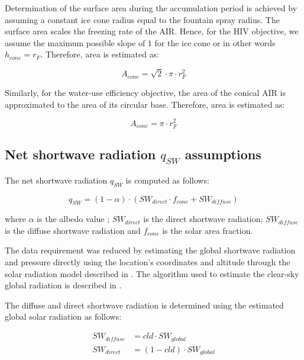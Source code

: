 \documentclass[tc, manuscript]{copernicus}
\begin{document}
Determination of the surface area during the accumulation period is achieved by assuming a constant ice cone
radius equal to the fountain spray radius. The surface area scales the freezing rate of the AIR. Hence, for the
HIV objective, we assume the maximum possible slope of 1 for the ice cone or in other words $h_{cone} = r_{F}$.
Therefore, area is estimated as:  

\begin{equation} A_{cone} =\sqrt{2} \cdot \pi \cdot r_{F}^2  \end{equation}

Similarly, for the water-use efficiency objective, the area of the conical AIR is approximated to the area of
its circular base. Therefore, area is estimated as:

\begin{equation} A_{cone} =\pi \cdot r_{F}^2  \end{equation}

\subsection{Net shortwave radiation \texorpdfstring{$q_{SW}$}{Lg} assumptions}
\label{sec:SW}

The net shortwave radiation $q_{SW}$ is computed as follows:

\begin{equation} 
q_{SW} = (1- \alpha) \cdot ( SW_{direct} \cdot f_{cone} + SW_{diffuse})
\label{eqn:SW} 
\end{equation}

where $\alpha$ is the albedo value ; $SW_{direct}$ is the direct shortwave radiation; $SW_{diffuse}$ is the
diffuse shortwave radiation and $f_{cone}$ is the solar area fraction.

The data requirement was reduced by estimating the global shortwave radiation and pressure directly using the
location's coordinates and altitude through the solar radiation model described in
\citet{holmgrenPvlibPythonPython2018}. The algorithm used to estimate the clear-sky global radiation is
described in \citet{ineichenBroadbandSimplifiedVersion2008}.  

The diffuse and direct shortwave radiation is determined using the estimated global solar radiation as follows:

\begin{equation}
\begin{split}
  SW_{diffuse} &= cld \cdot SW_{global}\\
  SW_{direct} &= (1-cld) \cdot SW_{global}
\end{split}
\end{equation}
\end{document}
